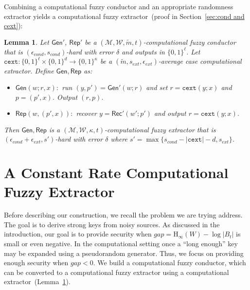 \documentclass[11pt]{article}
\newcommand{\secref}[1]{\mbox{Section~\ref{#1}}}
\newcommand{\lemref}[1]{\mbox{Lemma~\ref{#1}}}
\newcommand{\class}[1]{{\ensuremath{\mathsf{#1}}}}
\newcommand{\gen}{\ensuremath{\class{Gen}}\xspace}
\newcommand{\rep}{\ensuremath{\class{Rep}}\xspace}
\newcommand{\rec}{\ensuremath{\class{Rec}}\xspace}
\newcommand{\zo}{\ensuremath{\{0, 1\}}}
\newcommand{\Hoo}{\mathrm{H}_\infty}
\newcommand{\cext}{\ensuremath{\mathtt{cext}}}
\newtheorem{lemma}[theorem]{Lemma}
\begin{document}
Combining a computational fuzzy conductor and an appropriate randomness extractor yields a computational fuzzy extractor~(proof in \secref{sec:cond and cext}):

\begin{lemma}
\label{lem:cond and cext}
Let $\gen'$, $\rep'$ be a $(\mathcal{M}, \mathcal{W}, \tilde{m}, t)$-computational fuzzy conductor that is $(\epsilon_{cond}, s_{cond})$-hard with error $\delta$ and outputs in $\zo^\ell$.  Let $\cext:\zo^\ell\times \zo^d\rightarrow \zo^\kappa$ be a $(\tilde{m}, s_{ext}, \epsilon_{ext})$-average case computational extractor.  Define $\gen, \rep$ as:
\begin{itemize}
\item $\gen(w; r, x):$ run $(y, p')= \gen'(w; r)$ and set $r = \cext(y; x)$ and $p = (p', x)$.  Output $(r, p)$.
\item $\rep(w, (p', x)):$ recover $y = \rec'(w'; p')$ and output $r = \cext(y; x)$. 
\end{itemize}
Then $\gen, \rep$ is a $(\mathcal{M}, \mathcal{W}, \kappa, t)$-computational fuzzy extractor that is $(\epsilon_{cond}+\epsilon_{ext}, s')$-hard with error $\delta$ where $s' = \max\{s_{cond} - |\cext| -d, s_{ext}\}$.
\end{lemma}


\section{A Constant Rate Computational Fuzzy Extractor}
\label{sec:construction}

Before describing our construction, we recall the problem we are trying address.  The goal is to derive strong keys from noisy sources.  As discussed in the introduction, our goal is to provide security when $gap = \Hoo(W) - \log|B_t|$ is small or even negative.
In the computational setting once a ``long enough'' key may be expanded using a pseudorandom generator.  Thus, we focus on providing enough security when $gap<0$.  We build a computational fuzzy conductor, which can be converted to a computational fuzzy extractor using a computational extractor~(\lemref{lem:cond and cext}).%
\end{document}
